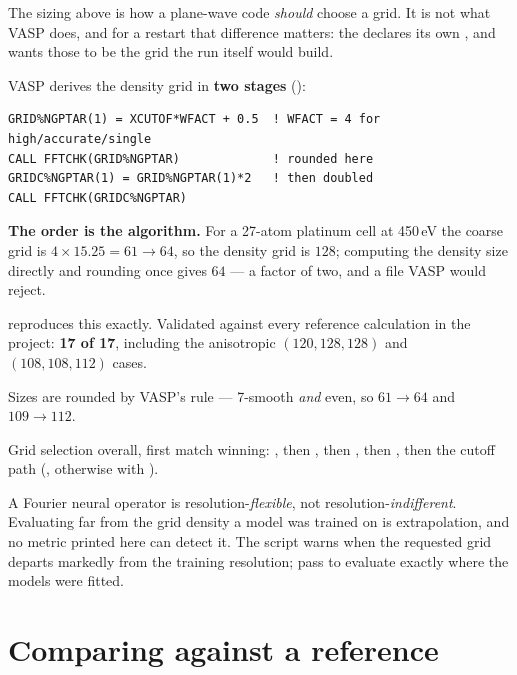 The sizing above is how a plane-wave code \emph{should} choose a grid. It is
not what VASP does, and for a restart that difference matters: the
 declares its own , and  wants
those to be the grid the run itself would build.

VASP derives the density grid in \textbf{two stages} ():

\begin{lstlisting}[style=fortran]
GRID%NGPTAR(1) = XCUTOF*WFACT + 0.5  ! WFACT = 4 for high/accurate/single
CALL FFTCHK(GRID%NGPTAR)             ! rounded here
GRIDC%NGPTAR(1) = GRID%NGPTAR(1)*2   ! then doubled
CALL FFTCHK(GRIDC%NGPTAR)
\end{lstlisting}

\begin{pwarn}
\textbf{The order is the algorithm.} For a 27-atom platinum cell at 450\,eV the
coarse grid is $4\times15.25 = 61 \to 64$, so the density grid is $128$;
computing the density size directly and rounding once gives $64$ --- a factor
of two, and a file VASP would reject.
\end{pwarn}

 reproduces this exactly. Validated against every reference
calculation in the project: \textbf{17 of 17}, including the anisotropic
$(120,128,128)$ and $(108,108,112)$ cases.

\begin{ptip}
Sizes are rounded by VASP's  rule --- 7-smooth \emph{and} even, so
$61 \to 64$ and $109 \to 112$.
\end{ptip}

Grid selection overall, first match winning: , then ,
then , then , then the cutoff path
(, otherwise  with ).

\begin{pwarn}
A Fourier neural operator is resolution-\emph{flexible}, not
resolution-\emph{indifferent}. Evaluating far from the grid density a model was
trained on is extrapolation, and no metric printed here can detect it. The
script warns when the requested grid departs markedly from the training
resolution; pass  to evaluate exactly where the models
were fitted.
\end{pwarn}

\section{Comparing against a reference}

